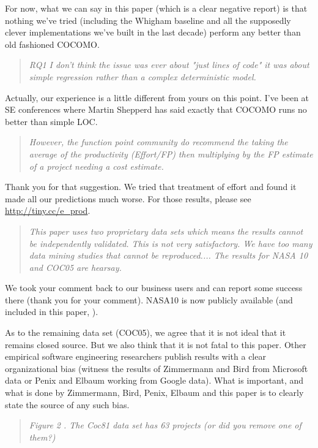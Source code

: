 For now, what we can say in this paper (which is a clear negative report) is
that nothing we've tried (including the Whigham baseline and
all the supposedly clever implementations
we've built in the last decade) perform any better than old fashioned COCOMO.

\begin{quote}{\em RQ1 I don't think the issue was ever about "just lines of code" it was about simple regression rather than a complex  deterministic model. }\end{quote}

Actually, our experience is a little different from yours on this point.
I've been at SE conferences where Martin Shepperd  has said exactly that COCOMO
runs no better than simple LOC.

\begin{quote}{\em However,  the function point community do recommend the taking the average of the productivity (Effort/FP) then multiplying by the FP estimate of a project needing a cost estimate.}\end{quote}

Thank you for that suggestion. We tried that treatment of  effort
and found it made all our predictions much worse. For those results,
please  see \url{http://tiny.cc/e_prod}.  


\begin{quote}{\em 
  This paper uses two proprietary data sets which means the results cannot be independently validated. This is not very satisfactory. We have too many data mining studies that cannot be reproduced....
The results for NASA 10 and COC05 are hearsay.}\end{quote}

We took your comment back to our business users and can report some success there (thank you for your comment).
NASA10 is now publicly available (and included in this paper, ).

As to the remaining data set (COC05),
we agree that it is not ideal that it remains closed source.  But
we also think that it is not fatal to this paper. 
Other empirical software engineering researchers publish
results with a clear organizational bias (witness the results
of Zimmermann and Bird from Microsoft data
or Penix and Elbaum working from Google data). What is important, and what is done by Zimmermann, Bird,
Penix, Elbaum and this paper is to clearly state the source of any such bias.

\begin{quote}{\em Figure 2 . The Coc81 data set has 63 projects (or did you remove one of them?)}\end{quote}

